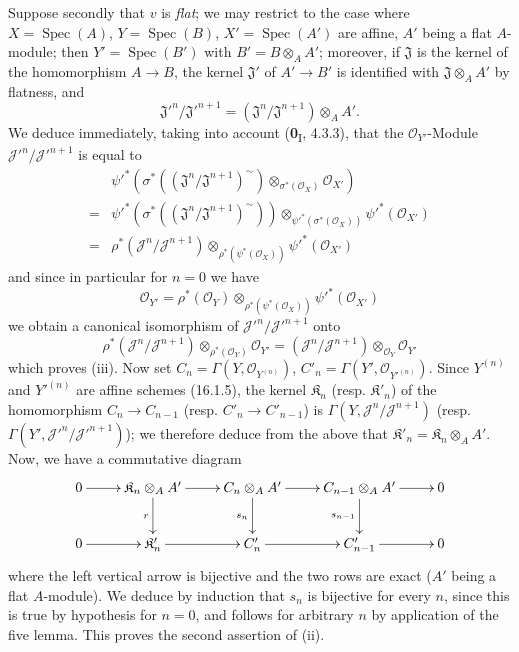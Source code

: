 Suppose secondly that $v$ is \emph{flat}; we may restrict to the case where
$X=\operatorname{Spec}(A)$, $Y=\operatorname{Spec}(B)$,
$X'=\operatorname{Spec}(A')$ are affine, $A'$ being a flat $A$-module;
then $Y'=\operatorname{Spec}(B')$ with $B'=B\otimes_A A'$; moreover, if
$\mathfrak{J}$ is the kernel of the homomorphism $A\to B$, the kernel
$\mathfrak{J}'$ of $A'\to B'$ is identified with $\mathfrak{J}\otimes_A A'$ by
flatness, and
\[
  \mathfrak{J}'^n/\mathfrak{J}'^{n+1}
  =(\mathfrak{J}^n/\mathfrak{J}^{n+1})\otimes_A A'.
\]
We deduce immediately, taking into account (\textbf{0}\textsubscript{I}, 4.3.3), that the
$\mathcal{O}_{Y'}$-Module
$\mathscr{J}'^n/\mathscr{J}'^{n+1}$ is equal to
\begin{align*}
&\psi'^*\!\left(\sigma^*
  \left((\mathfrak{J}^n/\mathfrak{J}^{n+1})^{\sim}\right)
  \otimes_{\sigma^*(\mathcal{O}_X)}\mathcal{O}_{X'}\right) \\
={}&
\psi'^*\!\left(\sigma^*
  \left((\mathfrak{J}^n/\mathfrak{J}^{n+1})^{\sim}\right)\right)
  \otimes_{\psi'^*(\sigma^*(\mathcal{O}_X))}
  \psi'^*(\mathcal{O}_{X'}) \\
={}&
\rho^*(\mathscr{J}^n/\mathscr{J}^{n+1})
  \otimes_{\rho^*(\psi^*(\mathcal{O}_X))}
  \psi'^*(\mathcal{O}_{X'})
\end{align*}
and since in particular for $n=0$ we have
\[
  \mathcal{O}_{Y'}=
  \rho^*(\mathcal{O}_Y)
  \otimes_{\rho^*(\psi^*(\mathcal{O}_X))}
  \psi'^*(\mathcal{O}_{X'})
\]
we obtain a canonical isomorphism of
$\mathscr{J}'^n/\mathscr{J}'^{n+1}$ onto
\[
  \rho^*(\mathscr{J}^n/\mathscr{J}^{n+1})
  \otimes_{\rho^*(\mathcal{O}_Y)}\mathcal{O}_{Y'}
  =
  (\mathscr{J}^n/\mathscr{J}^{n+1})
  \otimes_{\mathcal{O}_Y}\mathcal{O}_{Y'}
\]
which proves (iii). Now set
$C_n=\Gamma(Y,\mathcal{O}_{Y^{(n)}})$,
$C'_n=\Gamma(Y',\mathcal{O}_{Y'^{(n)}})$. Since $Y^{(n)}$ and
$Y'^{(n)}$ are affine schemes (16.1.5), the kernel
$\mathfrak{K}_n$ (resp. $\mathfrak{K}'_n$) of the homomorphism
$C_n\to C_{n-1}$ (resp. $C'_n\to C'_{n-1}$) is
$\Gamma(Y,\mathscr{J}^n/\mathscr{J}^{n+1})$ (resp.
$\Gamma(Y',\mathscr{J}'^n/\mathscr{J}'^{n+1})$); we therefore deduce from the
above that $\mathfrak{K}'_n=\mathfrak{K}_n\otimes_A A'$. Now, we have a
commutative diagram
\[
  \xymatrix{
    0 \ar[r] &
    \mathfrak{K}_n\otimes_A A' \ar[r]\ar[d]_r &
    C_n\otimes_A A' \ar[r]\ar[d]_{s_n} &
    C_{n-1}\otimes_A A' \ar[r]\ar[d]_{s_{n-1}} & 0 \\
    0 \ar[r] &
    \mathfrak{K}'_n \ar[r] &
    C'_n \ar[r] &
    C'_{n-1} \ar[r] & 0
  }
\]
where the left vertical arrow is bijective and the two rows are exact
($A'$ being a flat $A$-module). We deduce by induction that $s_n$ is
bijective for every $n$, since this is true by hypothesis for $n=0$, and follows
for arbitrary $n$ by application of the five lemma. This proves the second
assertion of (ii).

